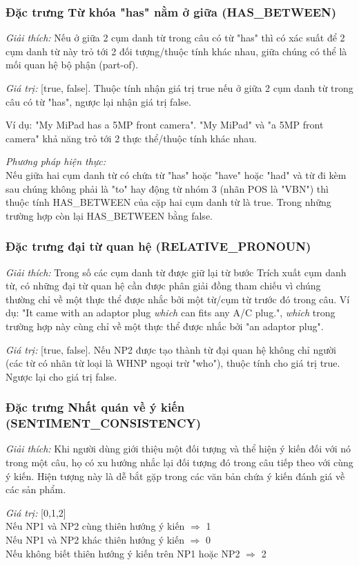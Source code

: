 \documentclass[12pt]{report}
\begin{document}
				\subsubsection*{Đặc trưng Từ khóa "has" nằm ở giữa (HAS\_BETWEEN)}
					\par \textit{Giải thích:} Nếu ở giữa 2 cụm danh từ trong câu có từ "has" thì có xác suất để 2 cụm danh từ này trỏ tới 2 đối tượng/thuộc tính khác nhau, giữa chúng có thể là mối quan hệ bộ phận (part-of). 
					\par \textit{Giá trị:} [true, false]. Thuộc tính nhận giá trị true nếu ở giữa 2 cụm danh từ trong câu có từ "has", ngược lại nhận giá trị false.
					\par Ví dụ:
					"My MiPad has a 5MP front camera". "My MiPad" và "a 5MP front camera" khả năng trỏ tới 2 thực thể/thuộc tính khác nhau.
									
					\par \textit{Phương pháp hiện thực:}
					\\Nếu giữa hai cụm danh từ có chứa từ "has" hoặc "have" hoặc "had" và từ đi kèm sau chúng không phải là "to" hay động từ nhóm 3 (nhãn POS là "VBN") thì thuộc tính HAS\_BETWEEN của cặp hai cụm danh từ là true. Trong những trường hợp còn lại HAS\_BETWEEN bằng false.

				\subsubsection*{Đặc trưng đại từ quan hệ (RELATIVE\_PRONOUN)}
					\par \textit{Giải thích:} Trong số các cụm danh từ được giữ lại từ bước Trích xuất cụm danh từ, có những đại từ quan hệ cần được phân giải đồng tham chiếu vì chúng thường chỉ về một thực thể được nhắc bởi một từ/cụm từ trước đó trong câu. Ví dụ: "It came with an adaptor plug \textit{which} can fits any A/C plug.", \textit{which} trong trường hợp này cùng chỉ về một thực thể được nhắc bởi "an adaptor plug".
					\par \textit{Giá trị:} [true, false]. Nếu NP2 được tạo thành từ đại quan hệ không chỉ người (các từ có nhãn từ loại là WHNP ngoại trừ "who"), thuộc tính cho giá trị true. Ngược lại cho giá trị false. 
	 
				\subsubsection*{Đặc trưng Nhất quán về ý kiến (SENTIMENT\_CONSISTENCY)}
					\par \textit{Giải thích:} Khi người dùng giới thiệu một đối tượng và thể hiện ý kiến đối với nó trong một câu, họ có xu hướng nhắc lại đối tượng đó trong câu tiếp theo với cùng ý kiến. Hiện tượng này là dễ bắt gặp trong các văn bản chứa ý kiến đánh giá về các sản phẩm.
					\par \textit{Giá trị:} [0,1,2]
					\\Nếu NP1 và NP2 cùng thiên hướng ý kiến $\Rightarrow$ 1
					\\Nếu NP1 và NP2 khác thiên hướng ý kiến $\Rightarrow$ 0
					\\Nếu không biết thiên hướng ý kiến trên NP1 hoặc NP2 $\Rightarrow$ 2
\end{document}
